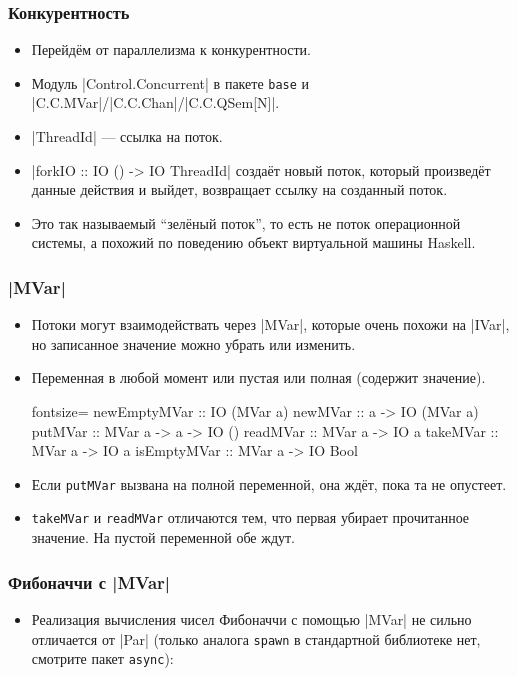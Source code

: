 \documentclass[11pt]{beamer}
\begin{document}
\begin{frame}[fragile]
  \frametitle{Конкурентность}
  \begin{itemize}
    \item Перейдём от параллелизма к конкурентности.
    \item Модуль \haskinline|Control.Concurrent| в пакете \lstinline|base| и \haskinline|C.C.MVar|/\haskinline|C.C.Chan|/\haskinline|C.C.QSem[N]|.
    \item \haskinline|ThreadId| --- ссылка на поток.
    \item \haskinline|forkIO :: IO () -> IO ThreadId| создаёт новый поток, который произведёт данные действия и выйдет, возвращает ссылку на созданный поток.
          \pause
    \item Это так называемый \enquote{зелёный поток}, то есть не поток операционной системы, а похожий по поведению объект виртуальной машины Haskell.
  \end{itemize}
\end{frame}

\begin{frame}[fragile]
  \frametitle{\haskinline|MVar|}
  \begin{itemize}
    \item Потоки могут взаимодействать через \haskinline|MVar|, которые очень похожи на \haskinline|IVar|, но записанное значение можно убрать или изменить.
    \item Переменная в любой момент или пустая или полная (содержит значение).
          \begin{haskell*}{fontsize=\footnotesize}
            newEmptyMVar :: IO (MVar a)
            newMVar :: a -> IO (MVar a)
            putMVar :: MVar a -> a -> IO ()
            readMVar :: MVar a -> IO a
            takeMVar :: MVar a -> IO a
            isEmptyMVar :: MVar a -> IO Bool
          \end{haskell*}
    \item Если \lstinline|putMVar| вызвана на полной переменной, она ждёт, пока та не опустеет.
    \item \lstinline|takeMVar| и \lstinline|readMVar| отличаются тем, что первая убирает прочитанное значение. На пустой переменной обе ждут.
  \end{itemize}
\end{frame}

\begin{frame}[fragile]
  \frametitle{Фибоначчи с \haskinline|MVar|}
  \begin{itemize}
    \item Реализация вычисления чисел Фибоначчи с помощью \haskinline|MVar| не сильно отличается от \haskinline|Par| (только аналога \lstinline|spawn| в стандартной библиотеке нет, смотрите пакет \lstinline|async|):
  \end{itemize}
\end{frame}
\end{document}

